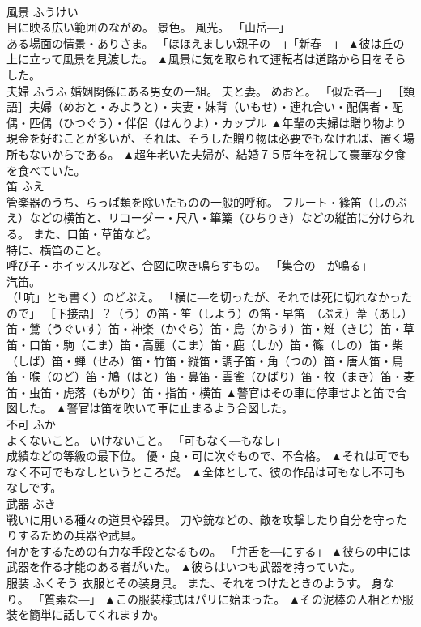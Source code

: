 \documentclass[8pt]{extreport}
\begin{document}
\begin{CJK}{UTF8}{min}
\\	風景	ふうけい	
\\	目に映る広い範囲のながめ。 景色。 風光。 「山岳―」 
\\	ある場面の情景・ありさま。 「ほほえましい親子の―」「新春―」	▲彼は丘の上に立って風景を見渡した。 ▲風景に気を取られて運転者は道路から目をそらした。
\\	夫婦	ふうふ	婚姻関係にある男女の一組。 夫と妻。 めおと。 「似た者―」 ［類語］夫婦（めおと・みようと）・夫妻・妹背（いもせ）・連れ合い・配偶者・配偶・匹偶（ひつぐう）・伴侶（はんりよ）・カップル	▲年輩の夫婦は贈り物より現金を好むことが多いが、それは、そうした贈り物は必要でもなければ、置く場所もないからである。 ▲超年老いた夫婦が、結婚７５周年を祝して豪華な夕食を食べていた。
\\	笛	ふえ	
\\	管楽器のうち、らっぱ類を除いたものの一般的呼称。 フルート・篠笛（しのぶえ）などの横笛と、リコーダー・尺八・篳篥（ひちりき）などの縦笛に分けられる。 また、口笛・草笛など。 
\\	特に、横笛のこと。 
\\	呼び子・ホイッスルなど、合図に吹き鳴らすもの。 「集合の―が鳴る」 
\\	汽笛。 
\\	（「吭」とも書く）のどぶえ。 「横に―を切ったが、それでは死に切れなかったので」 ［下接語］？（う）の笛・笙（しよう）の笛・早笛　（ぶえ）葦（あし）笛・鶯（うぐいす）笛・神楽（かぐら）笛・烏（からす）笛・雉（きじ）笛・草笛・口笛・駒（こま）笛・高麗（こま）笛・鹿（しか）笛・篠（しの）笛・柴（しば）笛・蝉（せみ）笛・竹笛・縦笛・調子笛・角（つの）笛・唐人笛・鳥笛・喉（のど）笛・鳩（はと）笛・鼻笛・雲雀（ひばり）笛・牧（まき）笛・麦笛・虫笛・虎落（もがり）笛・指笛・横笛	▲警官はその車に停車せよと笛で合図した。 ▲警官は笛を吹いて車に止まるよう合図した。
\\	不可	ふか	
\\	よくないこと。 いけないこと。 「可もなく―もなし」 
\\	成績などの等級の最下位。 優・良・可に次ぐもので、不合格。	▲それは可でもなく不可でもなしというところだ。 ▲全体として、彼の作品は可もなし不可もなしです。
\\	武器	ぶき	
\\	戦いに用いる種々の道具や器具。 刀や銃などの、敵を攻撃したり自分を守ったりするための兵器や武具。 
\\	何かをするための有力な手段となるもの。 「弁舌を―にする」	▲彼らの中には武器を作る才能のある者がいた。 ▲彼らはいつも武器を持っていた。
\\	服装	ふくそう	衣服とその装身具。 また、それをつけたときのようす。 身なり。 「質素な―」	▲この服装様式はパリに始まった。 ▲その泥棒の人相とか服装を簡単に話してくれますか。

\end{CJK}
\end{document}
